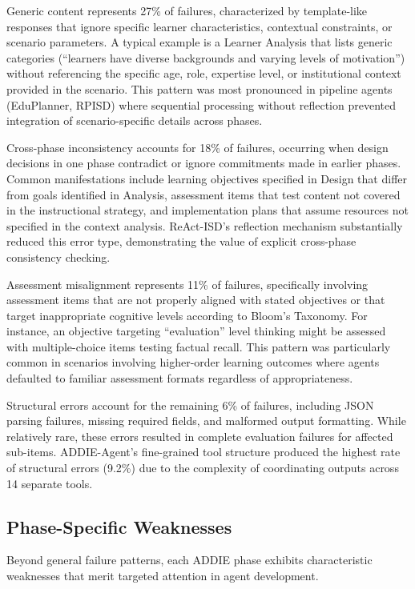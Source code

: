 Generic content represents 27\% of failures, characterized by template-like responses that ignore specific learner characteristics, contextual constraints, or scenario parameters. A typical example is a Learner Analysis that lists generic categories (``learners have diverse backgrounds and varying levels of motivation'') without referencing the specific age, role, expertise level, or institutional context provided in the scenario. This pattern was most pronounced in pipeline agents (EduPlanner, RPISD) where sequential processing without reflection prevented integration of scenario-specific details across phases.

Cross-phase inconsistency accounts for 18\% of failures, occurring when design decisions in one phase contradict or ignore commitments made in earlier phases. Common manifestations include learning objectives specified in Design that differ from goals identified in Analysis, assessment items that test content not covered in the instructional strategy, and implementation plans that assume resources not specified in the context analysis. ReAct-ISD's reflection mechanism substantially reduced this error type, demonstrating the value of explicit cross-phase consistency checking.

Assessment misalignment represents 11\% of failures, specifically involving assessment items that are not properly aligned with stated objectives or that target inappropriate cognitive levels according to Bloom's Taxonomy. For instance, an objective targeting ``evaluation'' level thinking might be assessed with multiple-choice items testing factual recall. This pattern was particularly common in scenarios involving higher-order learning outcomes where agents defaulted to familiar assessment formats regardless of appropriateness.

Structural errors account for the remaining 6\% of failures, including JSON parsing failures, missing required fields, and malformed output formatting. While relatively rare, these errors resulted in complete evaluation failures for affected sub-items. ADDIE-Agent's fine-grained tool structure produced the highest rate of structural errors (9.2\%) due to the complexity of coordinating outputs across 14 separate tools.

\subsection{Phase-Specific Weaknesses}

Beyond general failure patterns, each ADDIE phase exhibits characteristic weaknesses that merit targeted attention in agent development.

